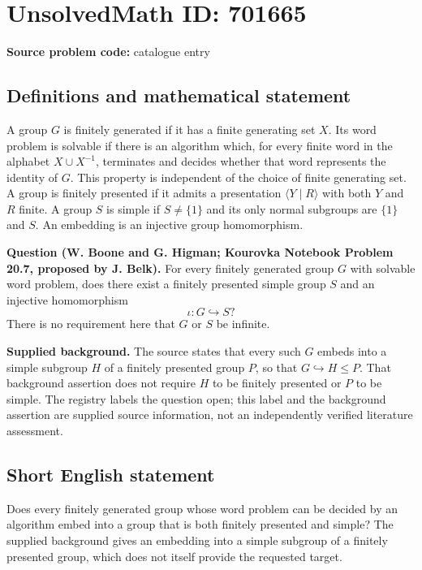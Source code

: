 \documentclass[11pt]{article}
\begin{document}
\section*{UnsolvedMath ID: 701665}
\textbf{Source problem code:} catalogue entry
\subsection{Definitions and mathematical statement}
A group \(G\) is finitely generated if it has a finite generating set \(X\). Its word problem is solvable if there is an algorithm which, for every finite word in the alphabet \(X\cup X^{-1}\), terminates and decides whether that word represents the identity of \(G\). This property is independent of the choice of finite generating set. A group is finitely presented if it admits a presentation \(\langle Y\mid R\rangle\) with both \(Y\) and \(R\) finite. A group \(S\) is simple if \(S\ne\{1\}\) and its only normal subgroups are \(\{1\}\) and \(S\). An embedding is an injective group homomorphism.

\textbf{Question (W. Boone and G. Higman; Kourovka Notebook Problem 20.7, proposed by J. Belk).} For every finitely generated group \(G\) with solvable word problem, does there exist a finitely presented simple group \(S\) and an injective homomorphism
\[
\iota:G\hookrightarrow S?
\]
There is no requirement here that \(G\) or \(S\) be infinite.

\textbf{Supplied background.} The source states that every such \(G\) embeds into a simple subgroup \(H\) of a finitely presented group \(P\), so that \(G\hookrightarrow H\leq P\). That background assertion does not require \(H\) to be finitely presented or \(P\) to be simple. The registry labels the question open; this label and the background assertion are supplied source information, not an independently verified literature assessment.
\subsection{Short English statement}
Does every finitely generated group whose word problem can be decided by an algorithm embed into a group that is both finitely presented and simple? The supplied background gives an embedding into a simple subgroup of a finitely presented group, which does not itself provide the requested target.
\end{document}
